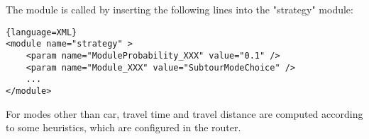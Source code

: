 The module is called by inserting the following lines into the "strategy" module:
\begin{lstlisting}{language=XML}
<module name="strategy" >
    <param name="ModuleProbability_XXX" value="0.1" />
    <param name="Module_XXX" value="SubtourModeChoice" />
    ...
</module>
\end{lstlisting}


For modes other than car, travel time and travel distance are  computed according to some heuristics, which are configured in the  router.

\vfill\eject





